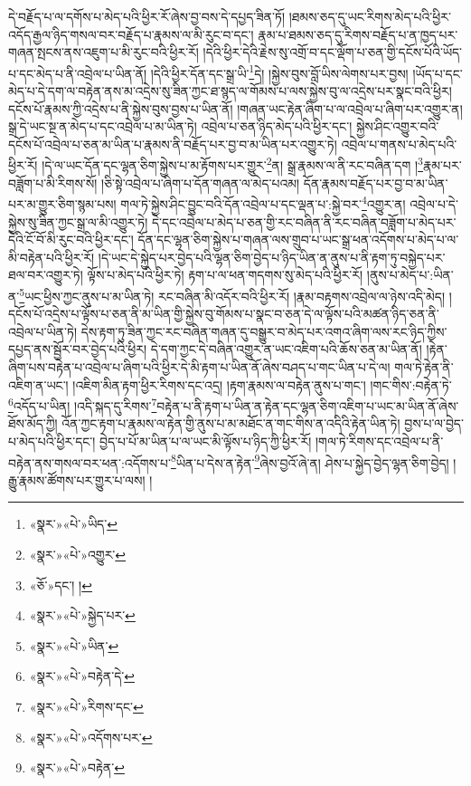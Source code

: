 དེ་བརྗོད་པ་ལ་དགོས་པ་མེད་པའི་ཕྱིར་རོ་ཞེས་བྱ་བས་དེ་དཔྱད་ཟིན་ཏོ། །ཐམས་ཅད་དུ་ཡང་རིགས་མེད་པའི་ཕྱིར་འདོད་རྒྱལ་ཉིད་གསལ་བར་བརྗོད་པ་རྣམས་ལ་མི་རུང་བ་དང་། རྣམ་པ་ཐམས་ཅད་དུ་རིགས་བརྗོད་པ་ན་ཁྱད་པར་གཞན་སྤངས་ནས་འཇུག་པ་མི་རུང་བའི་ཕྱིར་རོ། །དེའི་ཕྱིར་དེའི་རྗེས་སུ་འགྲོ་བ་དང་ལྡོག་པ་ཅན་གྱི་དངོས་པོའི་ཡོད་པ་དང་མེད་པ་ནི་འབྲེལ་པ་ཡིན་ནོ། །དེའི་ཕྱིར་དོན་དང་སྒྲ་ཡི་\footnote{«སྣར་»«པེ་»ཡིད་}དེ། །སྐྱེས་བུས་བློ་ཡིས་ལེགས་པར་བྱས། །ཡོད་པ་དང་མེད་པ་དེ་དག་ལ་བརྟེན་ནས་མ་འདྲེས་སུ་ཟིན་ཀྱང་ཐ་སྙད་ལ་གོམས་པ་ལས་སྐྱེས་བུ་ལ་འདྲེས་པར་སྣང་བའི་ཕྱིར། དངོས་པོ་རྣམས་ཀྱི་འདྲེས་པ་ནི་སྐྱེས་བུས་བྱས་པ་ཡིན་ནོ། །གཞན་ཡང་རྟེན་ཞིག་པ་ལ་འབྲེལ་པ་ཞིག་པར་འགྱུར་ན། སྒྲ་དེ་ཡང་སྔ་ན་མེད་པ་དང་འབྲེལ་པ་མ་ཡིན་ཏེ། འབྲེལ་པ་ཅན་ཉིད་མེད་པའི་ཕྱིར་དང་། སྐྱེས་ཤིང་འགྱུར་བའི་དངོས་པོ་འབྲེལ་པ་ཅན་མ་ཡིན་པ་རྣམས་ནི་བརྗོད་པར་བྱ་བ་མ་ཡིན་པར་འགྱུར་ཏེ། འབྲེལ་པ་གནས་པ་མེད་པའི་ཕྱིར་རོ། །དེ་ལ་ཡང་དོན་དང་ལྷན་ཅིག་སྐྱེས་པ་མ་རྟོགས་པར་གྱུར་\footnote{«སྣར་»«པེ་»འགྱུར་}ན། སྒྲ་རྣམས་ལ་ནི་རང་བཞིན་དག །\footnote{«ཅོ་»དང་། །}རྣམ་པར་བཟློག་པ་མི་རིགས་སོ། །ཅི་སྟེ་འབྲེལ་པ་ཞིག་པ་དོན་གཞན་ལ་མེད་པའམ། དོན་རྣམས་བརྗོད་པར་བྱ་བ་མ་ཡིན་པར་མ་གྱུར་ཅིག་སྙམ་པས། གལ་ཏེ་སྐྱེས་ཤིང་བྱུང་བའི་དོན་འབྲེལ་པ་དང་ལྡན་པ་:སྐྱེ་བར་\footnote{«སྣར་»«པེ་»སྐྱེད་པར་}འགྱུར་ན། འབྲེལ་པ་དེ་སྐྱེས་སུ་ཟིན་ཀྱང་སྒྲ་ལ་མི་འགྱུར་ཏེ། དེ་དང་འབྲེལ་པ་མེད་པ་ཅན་གྱི་རང་བཞིན་ནི་རང་བཞིན་བཟློག་པ་མེད་པར་དེའི་ངོ་བོ་མི་རུང་བའི་ཕྱིར་དང་། དོན་དང་ལྷན་ཅིག་སྐྱེས་པ་གཞན་ལས་གྲུབ་པ་ཡང་སྒྲ་ཕན་འདོགས་པ་མེད་པ་ལ་མི་བརྟེན་པའི་ཕྱིར་རོ། །དེ་ཡང་དེ་སྐྱེད་པར་བྱེད་པའི་ལྷན་ཅིག་བྱེད་པ་ཉིད་ཡིན་ན་ནུས་པ་ནི་རྟག་ཏུ་བསྐྱེད་པར་ཐལ་བར་འགྱུར་ཏེ། ལྟོས་པ་མེད་པའི་ཕྱིར་ཏེ། རྟག་པ་ལ་ཕན་གདགས་སུ་མེད་པའི་ཕྱིར་རོ། །ནུས་པ་མེད་པ་:ཡིན་ན་\footnote{«སྣར་»«པེ་»ཡིན་}ཡང་ཕྱིས་ཀྱང་ནུས་པ་མ་ཡིན་ཏེ། རང་བཞིན་མི་འདོར་བའི་ཕྱིར་རོ། །རྣམ་བརྟགས་འབྲེལ་ལ་ཉེས་འདི་མེད། །དངོས་པོ་འདྲེས་པ་ལྟོས་པ་ཅན་ནི་མ་ཡིན་གྱི་སྐྱེས་བུ་གོམས་པ་སྣང་བ་ཅན་དེ་ལ་ལྟོས་པའི་མཚན་ཉིད་ཅན་ནི་འབྲེལ་པ་ཡིན་ཏེ། དེས་རྟག་ཏུ་ཟིན་ཀྱང་རང་བཞིན་གཞན་དུ་བསྒྱུར་བ་མེད་པར་འགའ་ཞིག་ལས་རང་ཉིད་ཀྱིས་དཔྱད་ནས་སྦྱོར་བར་བྱེད་པའི་ཕྱིར། དེ་དག་ཀྱང་དེ་བཞིན་འགྱུར་ན་ཡང་འཇིག་པའི་ཆོས་ཅན་མ་ཡིན་ནོ། །རྟེན་ཞིག་པས་བརྟེན་པ་འབྲེལ་པ་ཞིག་པའི་ཕྱིར་དེ་མི་རྟག་པ་ཡིན་ནོ་ཞེས་བཤད་པ་གང་ཡིན་པ་དེ་ལ། གལ་ཏེ་རྟེན་ནི་འཇིག་ན་ཡང་། །འཇིག་མིན་རྟག་ཕྱིར་རིགས་དང་འདྲ། །རྟག་རྣམས་ལ་བརྟེན་ནུས་པ་གང་། །གང་གིས་:བརྟེན་ཏེ་\footnote{«སྣར་»«པེ་»བརྟེན་དེ་}འདོད་པ་ཡིན། །འདི་སྐད་དུ་རིགས་\footnote{«སྣར་»«པེ་»རིགས་དང་}བརྟེན་པ་ནི་རྟག་པ་ཡིན་ན་རྟེན་དང་ལྷན་ཅིག་འཇིག་པ་ཡང་མ་ཡིན་ནོ་ཞེས་ཐོས་མོད་ཀྱི། འོན་ཀྱང་རྟག་པ་རྣམས་ལ་རྟེན་གྱི་ནུས་པ་མ་མཐོང་ན་གང་གིས་ན་འདིའི་རྟེན་ཡིན་ཏེ། བྱས་པ་ལ་བྱེད་པ་མེད་པའི་ཕྱིར་དང་། བྱེད་པ་པོ་མ་ཡིན་པ་ལ་ཡང་མི་ལྟོས་པ་ཉིད་ཀྱི་ཕྱིར་རོ། །གལ་ཏེ་རིགས་དང་འབྲེལ་པ་ནི་བརྟེན་ནས་གསལ་བར་ཕན་:འདོགས་པ་\footnote{«སྣར་»«པེ་»འདོགས་པར་}ཡིན་པ་དེས་ན་རྟེན་\footnote{«སྣར་»«པེ་»བརྟེན་}ཞེས་བྱའོ་ཞེ་ན། ཤེས་པ་སྐྱེད་བྱེད་ལྷན་ཅིག་བྱེད། །རྒྱུ་རྣམས་ཚོགས་པར་གྱུར་པ་ལས། །
